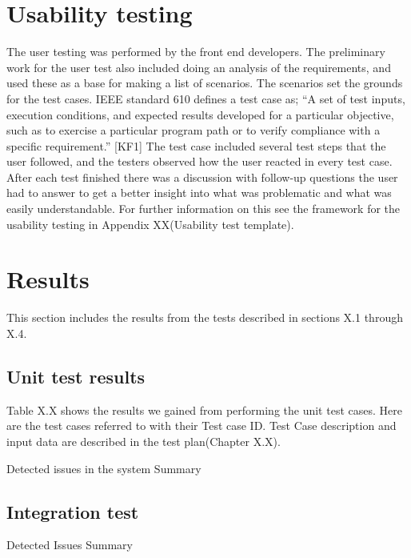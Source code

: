 \section{Usability testing}

The user testing was performed by the front end developers. The preliminary work for the user test also included doing an analysis of the requirements, and used these as a base for making a list of scenarios. The scenarios set the grounds for the test cases. IEEE standard 610 defines a test case as; “A set of test inputs, execution conditions, and expected results developed for a particular objective, such as to exercise a particular program path or to verify compliance with a specific requirement.” [KF1] 
The test case included several test steps that the user followed, and the testers observed how the user reacted in every test case. After each test finished there was a discussion with follow-up questions the user had to answer to get a better insight into what was problematic and what was easily understandable. For further information on this see the framework for the usability testing in Appendix XX(Usability test template).

\section{Results}

This section includes the results from the tests described in sections X.1 through X.4.

\subsection{Unit test results}

Table X.X shows the results we gained from performing the unit test cases. Here are the test cases referred to with their Test case ID. Test Case description and input data are described in the test plan(Chapter X.X).\newline

Detected issues in the system\newline 
Summary \newline 

\subsection{Integration test}
Detected Issues\newline
Summary


